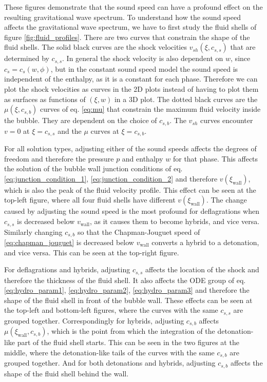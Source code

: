 


These figures demonstrate that the sound speed can have a profound effect on the resulting gravitational wave spectrum.
To understand how the sound speed affects the gravitational wave spectrum,
we have to first study the fluid shells of figure \ref{fig:fluid_profiles}.
There are two curves that constrain the shape of the fluid shells.
The solid black curves are the shock velocities $v_{sh}(\xi,c_{s,s})$ that are determined by $c_{s,s}$.
In general the shock velocity is also dependent on $w$, since $c_s = c_s(w,\phi)$,
but in the constant sound speed model the sound speed is independent of the enthalpy,
as it is a constant for each phase.
Therefore we can plot the shock velocities as curves in the 2D plots instead of having to plot them as surfaces as functions of $(\xi,w)$ in a 3D plot.
The dotted black curves are the $\mu(\xi,c_{s,b})$ curves of eq. \eqref{eq:mu} that constrain the maximum fluid velocity inside the bubble.
They are dependent on the choice of $c_{s,b}$.
The $v_{sh}$ curves encounter $v=0$ at $\xi = c_{s,s}$ and the $\mu$ curves at $\xi = c_{s,b}$.

For all solution types, adjusting either of the sound speeds affects the degrees of freedom and therefore the pressure $p$ and enthalpy $w$ for that phase.
This affects the solution of the bubble wall junction conditions of eq. \eqref{eq:junction_condition_1}, \eqref{eq:junction_condition_2} and therefore $v(\xi_\text{wall})$,
which is also the peak of the fluid velocity profile.
This effect can be seen at the top-left figure, where all four fluid shells have different $v(\xi_\text{wall})$.
The change caused by adjusting the sound speed is the most profound for deflagrations when $c_{s,s}$ is decreased below $v_\text{wall}$, as it causes them to become hybrids, and vice versa.
Similarly changing $c_{s,b}$ so that the Chapman-Jouguet speed of \eqref{eq:chapman_jouguet} is decreased below $v_\text{wall}$ converts a hybrid to a detonation, and vice versa.
This can be seen at the top-right figure.

For deflagrations and hybrids, adjusting $c_{s,s}$ affects the location of the shock and therefore the thickness of the fluid shell.
It also affects the ODE group of eq. \eqref{eq:hydro_param1}, \eqref{eq:hydro_param2}, \eqref{eq:hydro_param3} and therefore the shape of the fluid shell in front of the bubble wall.
These effects can be seen at the top-left and bottom-left figures, where the curves with the same $c_{s,s}$ are grouped together.
Correspondingly for hybrids, adjusting $c_{s,b}$ affects $\mu(\xi_\text{wall},c_{s,b})$,
which is the point from which the integration of the detonation-like part of the fluid shell starts.
This can be seen in the two figures at the middle, where the detonation-like tails of the curves with the same $c_{s,b}$ are grouped together.
And for both detonations and hybrids, adjusting $c_{s,b}$ affects the shape of the fluid shell behind the wall.


